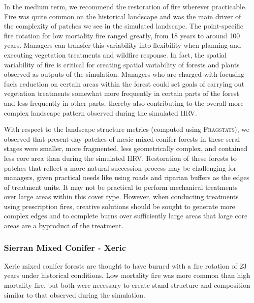 In the medium term, we recommend the restoration of fire wherever practicable. Fire was quite common on the historical landscape and was the main driver of the complexity of patches we see in the simulated landscape. The point-specific fire rotation for low mortality fire ranged greatly, from 18 years to around 100 years. Managers can transfer this variability into flexibility when planning and executing vegetation treatments and wildfire response. In fact, the spatial variability of fire is critical for creating spatial variability of forests and plants observed as outputs of the simulation. Managers who are charged with focusing fuels reduction on certain areas within the forest could set goals of carrying out vegetation treatments somewhat more frequently in certain parts of the forest and less frequently in other parts, thereby also contributing to the overall more complex landscape pattern observed during the simulated HRV. 

With respect to the landscape structure metrics (computed using \textsc{Fragstats}), we observed that present-day patches of mesic mixed conifer forests in these seral stages were smaller, more fragmented, less geometrically complex, and contained less core area than during the simulated HRV. Restoration of these forests to patches that reflect a more natural succession process may be challenging for managers, given practical needs like using roads and riparian buffers as the edges of treatment units. It may not be practical to perform mechanical treatments over large areas within this cover type. However, when conducting treatments using prescription fires, creative solutions should be sought to generate more complex edges and to complete burns over sufficiently large areas that large core areas are a byproduct of the treatment.
       
\subsubsection{Sierran Mixed Conifer - Xeric}
Xeric mixed conifer forests are thought to have burned with a fire rotation of 23 years under historical conditions. Low mortality fire was more common than high mortality fire, but both were necessary to create stand structure and composition similar to that observed during the simulation. 

